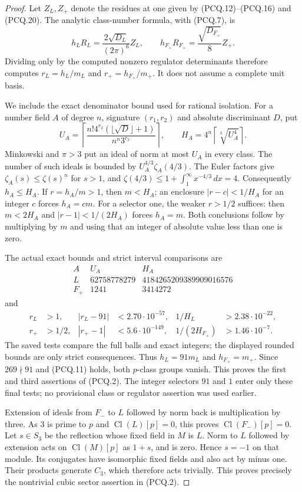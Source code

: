 \begin{proof}
Let $Z_L,Z_+$ denote the residues at one given by (PCQ.12)--(PCQ.16)
and (PCQ.20).  The analytic class-number formula, with (PCQ.7), is
\[
 h_LR_L=\frac{2\sqrt{D_L}}{(2\pi)^6}Z_L,
 \qquad h_{F_+}R_{F_+}=\frac{\sqrt{D_{F_+}}}{8}Z_+.
 \tag{PCQ.24}
\]
Dividing only by the computed nonzero regulator determinants
therefore computes $r_L=h_L/m_L$ and $r_+=h_{F_+}/m_+$.
It does not assume a complete unit basis.

We include the exact denominator bound used for rational isolation.
For a number field $A$ of degree $n$, signature $(r_1,r_2)$
and absolute discriminant $D$, put
\[
 U_A=\left\lceil\frac{n!4^{r_2}(\lfloor\sqrt D\rfloor+1)}
                              {n^n3^{r_2}}\right\rceil,
 \qquad H_A=4^n\left\lceil\sqrt[3]{U_A^4}\right\rceil.
 \tag{PCQ.25}
\]
Minkowski and $\pi>3$ put an ideal of norm at most $U_A$
in every class.  The number of such ideals is bounded by
$U_A^{4/3}\zeta_A(4/3)$.
The Euler factors give $\zeta_A(s)\leq\zeta(s)^n$ for $s>1$,
and $\zeta(4/3)\leq1+\int_1^\infty x^{-4/3}\,dx=4$.
Consequently $h_A\leq H_A$.
If $r=h_A/m>1$, then $m<H_A$; an enclosure
$|r-c|<1/H_A$ for an integer $c$ forces $h_A=cm$.
For a selector one, the weaker $r>1/2$ suffices:
then $m<2H_A$ and $|r-1|<1/(2H_A)$ forces $h_A=m$.
Both conclusions follow by multiplying by $m$ and using that
an integer of absolute value less than one is zero.

The actual exact bounds and strict interval comparisons are
\[
 \begin{array}{c|r|r}
 A&U_A&H_A\\ \hline
 L&62758778279&4184265209389909016576\\
 F_+&1241&3414272
 \end{array}
 \tag{PCQ.26}
\]
and
\[
 \begin{aligned}
 r_L&>1,&|r_L-91|&<2.70\cdot10^{-57},
                  &1/H_L&>2.38\cdot10^{-22},\\
 r_+&>1/2,&|r_+-1|&<5.6\cdot10^{-149},
                  &1/(2H_{F_+})&>1.46\cdot10^{-7}.
 \end{aligned}
 \tag{PCQ.27}
\]
The saved tests compare the full balls and exact integers;
the displayed rounded bounds are only strict consequences.
Thus $h_L=91m_L$ and $h_{F_+}=m_+$.
Since $269\nmid91$ and (PCQ.11) holds, both $p$-class groups
vanish.  This proves the first and third assertions of (PCQ.2).
The integer selectors $91$ and $1$ enter only these final tests;
no provisional class or regulator assertion was used earlier.

Extension of ideals from $F_-$ to $L$ followed by norm back is
multiplication by three.  As $3$ is prime to $p$ and
$\operatorname{Cl}(L)[p]=0$, this proves
$\operatorname{Cl}(F_-)[p]=0$.
Let $s\in S_3$ be the reflection whose fixed field in $M$
is $L$.  Norm to $L$ followed by extension acts on
$\operatorname{Cl}(M)[p]$ as $1+s$, and is zero.
Hence $s=-1$ on that module.  Its conjugates have isomorphic
fixed fields and also act by minus one.  Their products generate
$C_3$, which therefore acts trivially.  This proves precisely
the nontrivial cubic sector assertion in (PCQ.2).


\end{proof}

